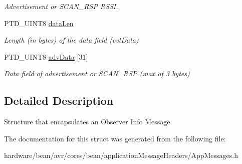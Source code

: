 \begin{DoxyCompactItemize}
\begin{DoxyCompactList}\small\item\em Advertisement or S\+C\+A\+N\+\_\+\+R\+S\+P R\+S\+S\+I. \end{DoxyCompactList}\item 
\hypertarget{struct_o_b_s_e_r_v_e_r___i_n_f_o___m_e_s_s_a_g_e___t_a33467e95974dbe9f3bebf54c10ce9404}{}P\+T\+D\+\_\+\+U\+I\+N\+T8 \hyperlink{struct_o_b_s_e_r_v_e_r___i_n_f_o___m_e_s_s_a_g_e___t_a33467e95974dbe9f3bebf54c10ce9404}{data\+Len}\label{struct_o_b_s_e_r_v_e_r___i_n_f_o___m_e_s_s_a_g_e___t_a33467e95974dbe9f3bebf54c10ce9404}

\begin{DoxyCompactList}\small\item\em Length (in bytes) of the data field (evt\+Data) \end{DoxyCompactList}\item 
\hypertarget{struct_o_b_s_e_r_v_e_r___i_n_f_o___m_e_s_s_a_g_e___t_a6f9ccb4068dec648b6f04589b1c8f0ef}{}P\+T\+D\+\_\+\+U\+I\+N\+T8 \hyperlink{struct_o_b_s_e_r_v_e_r___i_n_f_o___m_e_s_s_a_g_e___t_a6f9ccb4068dec648b6f04589b1c8f0ef}{adv\+Data} \mbox{[}31\mbox{]}\label{struct_o_b_s_e_r_v_e_r___i_n_f_o___m_e_s_s_a_g_e___t_a6f9ccb4068dec648b6f04589b1c8f0ef}

\begin{DoxyCompactList}\small\item\em Data field of advertisement or S\+C\+A\+N\+\_\+\+R\+S\+P (max of 3 bytes) \end{DoxyCompactList}\end{DoxyCompactItemize}


\subsection{Detailed Description}
Structure that encapsulates an Observer Info Message. 

The documentation for this struct was generated from the following file\+:\begin{DoxyCompactItemize}
\item 
hardware/bean/avr/cores/bean/application\+Message\+Headers/App\+Messages.\+h\end{DoxyCompactItemize}
